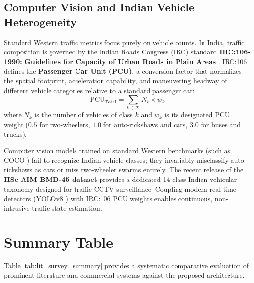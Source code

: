 \subsection{Computer Vision and Indian Vehicle Heterogeneity}
Standard Western traffic metrics focus purely on vehicle counts. In India, traffic composition is governed by the Indian Roads Congress (IRC) standard \textbf{IRC:106-1990: Guidelines for Capacity of Urban Roads in Plain Areas} \cite{ref_irc106}. IRC:106 defines the \textbf{Passenger Car Unit (PCU)}, a conversion factor that normalizes the spatial footprint, acceleration capability, and maneuvering headway of different vehicle categories relative to a standard passenger car:
\begin{equation}
\text{PCU}_{\text{Total}} = \sum_{k \in \mathcal{K}} N_k \times w_k
\end{equation}
where $N_k$ is the number of vehicles of class $k$ and $w_k$ is its designated PCU weight ($0.5$ for two-wheelers, $1.0$ for auto-rickshaws and cars, $3.0$ for buses and trucks).

Computer vision models trained on standard Western benchmarks (such as COCO \cite{ref_lin2014coco}) fail to recognize Indian vehicle classes; they invariably misclassify auto-rickshaws as cars or miss two-wheeler swarms entirely. The recent release of the \textbf{IISc AIM BMD-45 dataset} \cite{ref_iisc_bmd45} provides a dedicated 14-class Indian vehicular taxonomy designed for traffic CCTV surveillance. Coupling modern real-time detectors (YOLOv8 \cite{ref_yolov8}) with IRC:106 PCU weights enables continuous, non-intrusive traffic state estimation.

\section{Summary Table}
\label{sec:lit_summary_table}
Table \ref{tab:lit_survey_summary} provides a systematic comparative evaluation of prominent literature and commercial systems against the proposed architecture.

